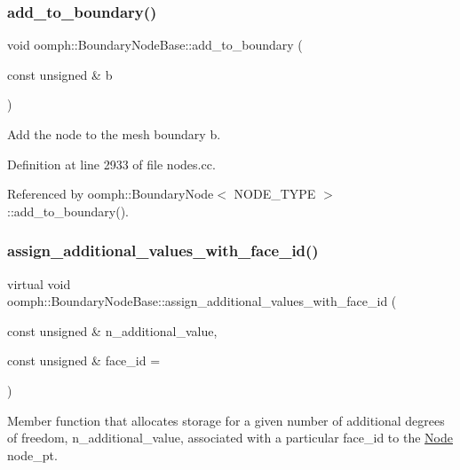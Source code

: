 \subsubsection{\texorpdfstring{add\+\_\+to\+\_\+boundary()}{add\_to\_boundary()}}
{\footnotesize\ttfamily void oomph\+::\+Boundary\+Node\+Base\+::add\+\_\+to\+\_\+boundary (\begin{DoxyParamCaption}\item[{const unsigned \&}]{b }\end{DoxyParamCaption})}



Add the node to the mesh boundary b. 



Definition at line 2933 of file nodes.\+cc.



Referenced by oomph\+::\+Boundary\+Node$<$ N\+O\+D\+E\+\_\+\+T\+Y\+P\+E $>$\+::add\+\_\+to\+\_\+boundary().

\mbox{\label{classoomph_1_1BoundaryNodeBase_a2af96b956e59182fe8bfe8e2a87e02ce}} 
\subsubsection{\texorpdfstring{assign\+\_\+additional\+\_\+values\+\_\+with\+\_\+face\+\_\+id()}{assign\_additional\_values\_with\_face\_id()}}
{\footnotesize\ttfamily virtual void oomph\+::\+Boundary\+Node\+Base\+::assign\+\_\+additional\+\_\+values\+\_\+with\+\_\+face\+\_\+id (\begin{DoxyParamCaption}\item[{const unsigned \&}]{n\+\_\+additional\+\_\+value,  }\item[{const unsigned \&}]{face\+\_\+id = {} }\end{DoxyParamCaption})\hspace{0.3cm}{\ttfamily [pure virtual]}}



Member function that allocates storage for a given number of additional degrees of freedom, n\+\_\+additional\+\_\+value, associated with a particular face\+\_\+id to the \hyperlink{classoomph_1_1Node}{Node} node\+\_\+pt. 



